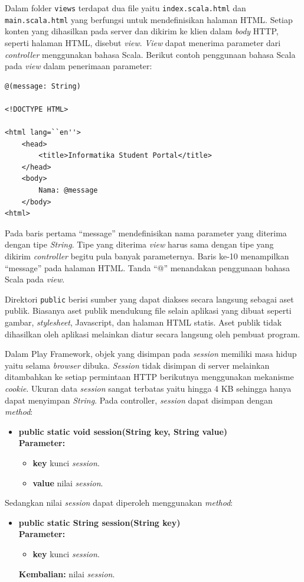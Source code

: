 Dalam folder \texttt{views} terdapat dua file yaitu \texttt{index.scala.html} dan \texttt{main.scala.html} yang berfungsi untuk mendefinisikan halaman HTML. Setiap konten yang dihasilkan pada server dan dikirim ke klien dalam \textit{body} HTTP, seperti halaman HTML, disebut \textit{view}. \textit{View} dapat menerima parameter dari \textit{controller} menggunakan bahasa Scala. Berikut contoh penggunaan bahasa Scala pada \textit{view} dalam penerimaan parameter:
\begin{lstlisting}
@(message: String)

<!DOCTYPE HTML>

<html lang=``en''>
	<head>
		<title>Informatika Student Portal</title>
	</head>
	<body>
		Nama: @message
	</body>
<html>
\end{lstlisting}
Pada baris pertama ``message'' mendefinisikan nama parameter yang diterima dengan tipe \textit{String}. Tipe yang diterima \textit{view} harus sama dengan tipe yang dikirim \textit{controller} begitu pula banyak parameternya. Baris ke-10 menampilkan ``message'' pada halaman HTML. Tanda ``@'' menandakan penggunaan bahasa Scala pada \textit{view}. 

Direktori \texttt{public} berisi sumber yang dapat diakses secara langsung sebagai aset publik. Biasanya aset publik mendukung file selain aplikasi yang dibuat seperti gambar, \textit{stylesheet}, Javascript, dan halaman HTML statis. Aset publik tidak dihasilkan oleh aplikasi melainkan diatur secara langsung oleh pembuat program.

Dalam Play Framework, objek yang disimpan pada \textit{session} memiliki masa hidup yaitu selama \textit{browser} dibuka. \textit{Session} tidak disimpan di server melainkan ditambahkan ke setiap permintaan HTTP berikutnya menggunakan mekanisme \textit{cookie}. Ukuran data \textit{session} sangat terbatas yaitu hingga 4 KB sehingga hanya dapat menyimpan \textit{String}. Pada controller, \textit{session} dapat disimpan dengan \textit{method}:
	\begin{itemize}
			\item \textbf{public static void session(String key, String value)} \\
				\textbf{Parameter:}
				\begin{itemize}
					\item \textbf{key} kunci \textit{session}.
					\item \textbf{value} nilai \textit{session}.
				\end{itemize}
	\end{itemize}
 Sedangkan nilai \textit{session} dapat diperoleh menggunakan \textit{method}: 
\begin{itemize}
			\item \textbf{public static String session(String key)} \\
				\textbf{Parameter:}
				\begin{itemize}
					\item \textbf{key} kunci \textit{session}.
				\end{itemize}
				\textbf{Kembalian:} nilai \textit{session}.
	\end{itemize}


